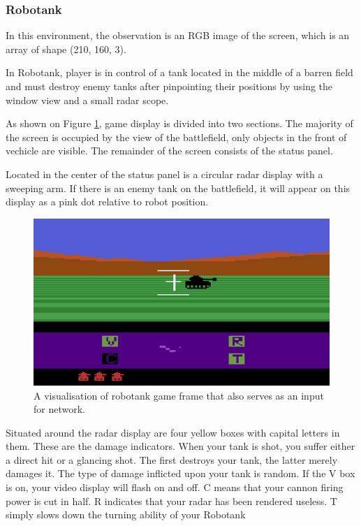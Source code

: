 \FloatBarrier
\subsubsection{Robotank}
In this environment, the observation is an RGB image of the screen, which is an array of shape 
(210, 160, 3).

In Robotank, player is in control of a tank located in the middle of a barren field and must 
destroy enemy tanks after pinpointing their positions by using the window view and a small 
radar scope.

As shown on Figure \ref{fig:robotank}, game display is divided into two sections. 
The majority of the screen is occupied by the view of the battlefield, only objects in 
the front of vechicle are visible. 
The remainder of the screen consists of the status panel.

Located in the center of the status panel is a circular radar display with a sweeping arm.
If there is an enemy tank on the battlefield, it will appear on this display as a pink dot 
relative to robot position.
\begin{figure}[htb] 
	\centering
	\includegraphics[width=\textwidth]{figures/robotank}
	\caption{A visualisation of robotank game frame that also serves as an input for network.}
	\label{fig:robotank}
\end{figure}

Situated around the radar display are four yellow boxes with capital letters in them.
These are the damage indicators. When your tank is shot, you suffer either a direct hit or a 
glancing shot. The first destroys your tank, the latter merely damages it.
The type of damage inflicted upon your tank is random.
If the V box is on, your video display will flash on and off. C means that your cannon 
firing power is cut in half. R indicates that your radar has been rendered useless.
T simply slows down the turning ability of your Robotank

